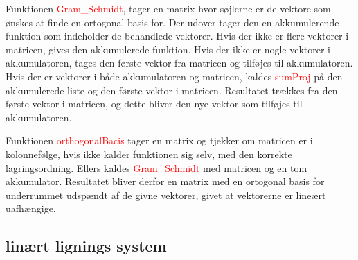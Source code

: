 Funktionen \textcolor{red}{Gram\_Schmidt}, tager en matrix hvor søjlerne er de vektore som ønskes at finde en ortogonal basis for. Der udover tager den en akkumulerende funktion som indeholder de behandlede vektorer. Hvis der ikke er flere vektorer i matricen, gives den akkumulerede funktion. Hvis der ikke er nogle vektorer i akkumulatoren, tages den første vektor fra matricen og tilføjes til akkumulatoren. Hvis der er vektorer i både akkumulatoren og matricen, kaldes \textcolor{red}{sumProj} på den akkumulerede liste og den første vektor i matricen. Resultatet trækkes fra den første vektor i matricen, og dette bliver den nye vektor som tilføjes til akkumulatoren. 

Funktionen \textcolor{red}{orthogonalBacis} tager en matrix og tjekker om matricen er i kolonnefølge, hvis ikke kalder funktionen sig selv, med den korrekte lagringsordning. Ellers kaldes \textcolor{red}{Gram\_Schmidt} med matricen og en tom akkumulator. Resultatet bliver derfor en matrix med en ortogonal basis for underrummet udspændt af de givne vektorer, givet at vektorerne er lineært uafhængige.

\subsection{linært lignings system}\label {sec:lin_eq}
